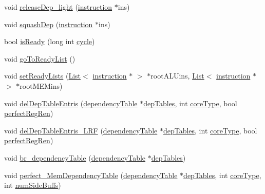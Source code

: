 \begin{DoxyCompactItemize}
\item 
void \hyperlink{classinstruction_a2efa8c5533c25ab4cf5fc812b65a0dc7}{releaseDep\_\-light} (\hyperlink{classinstruction}{instruction} $\ast$ins)
\item 
void \hyperlink{classinstruction_a9643852ed74b72636a5327a6278fe12f}{squashDep} (\hyperlink{classinstruction}{instruction} $\ast$ins)
\item 
bool \hyperlink{classinstruction_a3d3c5926b3f74fa012e77011f6d65a57}{isReady} (long int \hyperlink{vliwScheduler_8cpp_a1f4871d45089b039d95d3832dd123827}{cycle})
\item 
void \hyperlink{classinstruction_ae98b3fc0943715a103b91ab8bf272758}{goToReadyList} ()
\item 
void \hyperlink{classinstruction_a21509e081fdfd3665c30d1bab3e1fd45}{setReadyLists} (\hyperlink{classList}{List}$<$ \hyperlink{classinstruction}{instruction} $\ast$ $>$ $\ast$rootALUins, \hyperlink{classList}{List}$<$ \hyperlink{classinstruction}{instruction} $\ast$ $>$ $\ast$rootMEMins)
\item 
void \hyperlink{classinstruction_aa97fc6d29e3d841baede2a83414b3997}{delDepTableEntris} (\hyperlink{classdependencyTable}{dependencyTable} $\ast$\hyperlink{vliwScheduler_8cpp_ab1dae06b10269a1b683512c8ecb25def}{depTables}, int \hyperlink{vliwScheduler_8cpp_a617ce1763c0446f48a6d3a158d507f46}{coreType}, bool \hyperlink{bkEnd_8cpp_a24de26574dd41fb459f4e9c7eef97d2d}{perfectRegRen})
\item 
void \hyperlink{classinstruction_ae2485787a9240cab1aa5d9f87df01a04}{delDepTableEntris\_\-LRF} (\hyperlink{classdependencyTable}{dependencyTable} $\ast$\hyperlink{vliwScheduler_8cpp_ab1dae06b10269a1b683512c8ecb25def}{depTables}, int \hyperlink{vliwScheduler_8cpp_a617ce1763c0446f48a6d3a158d507f46}{coreType}, bool \hyperlink{bkEnd_8cpp_a24de26574dd41fb459f4e9c7eef97d2d}{perfectRegRen})
\item 
void \hyperlink{classinstruction_a578f14a412f7d77a1e87aa52af78eade}{br\_\-dependencyTable} (\hyperlink{classdependencyTable}{dependencyTable} $\ast$\hyperlink{vliwScheduler_8cpp_ab1dae06b10269a1b683512c8ecb25def}{depTables})
\item 
void \hyperlink{classinstruction_a213dc8dc75e0df8b8be759462b3cb8b9}{perfect\_\-MemDependencyTable} (\hyperlink{classdependencyTable}{dependencyTable} $\ast$\hyperlink{vliwScheduler_8cpp_ab1dae06b10269a1b683512c8ecb25def}{depTables}, int \hyperlink{vliwScheduler_8cpp_a617ce1763c0446f48a6d3a158d507f46}{coreType}, int \hyperlink{backend_2parser_8cpp_a33b052a847ffe72153acdfeaa15c48da}{numSideBuffs})

\end{DoxyCompactItemize}
